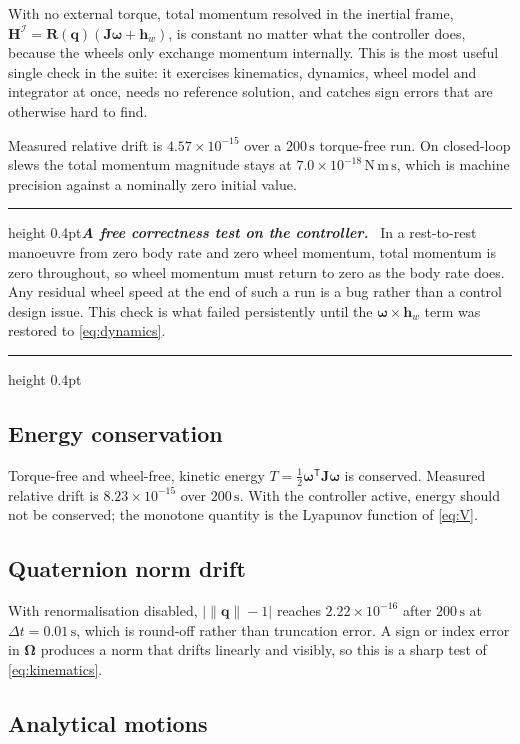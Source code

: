 \documentclass[conference,10pt,a4paper]{IEEEtran}
\newcommand{\remarkrule}{\par\nobreak\vspace{2pt}%
  \hrule height 0.4pt\vspace{4pt}\nobreak}
\newenvironment{keybox}[1][Result]
  {\par\medskip\remarkrule\noindent\small\textbf{\textit{#1.}}\ \ignorespaces}
  {\par\vspace{3pt}\hrule height 0.4pt\par\medskip\ignorespacesafterend}
\newcommand{\vect}[1]{\bm{#1}}
\newcommand{\mat}[1]{\bm{#1}}
\newcommand{\T}{^{\mathsf{T}}}
\newcommand{\FI}{\mathcal{I}}
\newcommand{\unit}[1]{\ensuremath{\,\mathrm{#1}}}
\begin{document}
With no external torque, total momentum resolved in the inertial frame,
$\vect{H}^{\FI} = \mat{R}(\vect{q})(\mat{J}\vect{\omega}+\vect{h}_w)$, is
constant no matter what the controller does, because the wheels only exchange
momentum internally. This is the most useful single check in the suite: it
exercises kinematics, dynamics, wheel model and integrator at once, needs no
reference solution, and catches sign errors that are otherwise hard to find.

Measured relative drift is $4.57\times10^{-15}$ over a $200\unit{s}$
torque-free run. On closed-loop slews the total momentum magnitude stays at
$7.0\times10^{-18}\unit{N\,m\,s}$, which is machine precision against a
nominally zero initial value.

\begin{keybox}[A free correctness test on the controller]
In a rest-to-rest manoeuvre from zero body rate and zero wheel momentum, total
momentum is zero throughout, so wheel momentum must return to zero as the body
rate does. Any residual wheel speed at the end of such a run is a bug rather
than a control design issue. This check is what failed persistently until the
$\vect{\omega}\times\vect{h}_w$ term was restored to \cref{eq:dynamics}.
\end{keybox}

\subsection{Energy conservation}

Torque-free and wheel-free, kinetic energy
$T=\tfrac{1}{2}\vect{\omega}\T\mat{J}\vect{\omega}$ is conserved. Measured
relative drift is $8.23\times10^{-15}$ over $200\unit{s}$. With the controller
active, energy should not be conserved; the monotone quantity is the Lyapunov
function of \cref{eq:V}.

\subsection{Quaternion norm drift}
\label{sec:normdrift}

With renormalisation disabled, $\left|\|\vect{q}\|-1\right|$ reaches
$2.22\times10^{-16}$ after $200\unit{s}$ at $\Delta t=0.01\unit{s}$, which is
round-off rather than truncation error. A sign or index error in $\mat{\Omega}$
produces a norm that drifts linearly and visibly, so this is a sharp test of
\cref{eq:kinematics}.

\subsection{Analytical motions}
\end{document}
